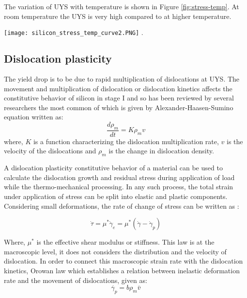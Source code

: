 The variation of UYS with temperature is shown in Figure \ref{fig:stress-temp}. At room temperature the UYS is very high compared to at higher temperature. 

\noindent
\begin{minipage}[c]{\textwidth}
\centering
       \texttt{[image: silicon\_stress\_temp\_curve2.PNG]}
      .
        \label{fig:stress-temp}
\end{minipage}

\subsection{Dislocation plasticity}

The yield drop is to be due to rapid multiplication of dislocations at UYS. The movement and multiplication of dislocation or dislocation kinetics affects the constitutive behavior of silicon in stage I and so has been reviewed by several researchers the most common of which is given by Alexander-Haasen-Sumino equation written as:
\begin{equation}
   \frac{d\rho_{m}}{dt} = K \rho_{m} v\label{has_1}
\end{equation}
where, $K$ is a function characterizing the dislocation multiplication rate, $v$ is the velocity of the dislocations and $\rho_{m}$ is the change in dislocation density.

A dislocation plasticity constitutive behavior of a material can be used to calculate the dislocation growth and residual stress during application of load while the thermo-mechanical processing. In any such process, the total strain under application of stress can be split into elastic and plastic components. Considering small deformations, the rate of change of stress can be written as :

\begin{equation}
   \dot{\tau} = \mu^{*}\dot{\gamma}_{e} = \mu^{*}(\dot{\gamma}- \dot{\gamma}_{p})\label{rate_eqn}
\end{equation}

Where, $\mu^{*}$ is the effective shear modulus or stiffness. This law is at the macroscopic level, it does not considers the distribution and the velocity of dislocation. In order to connect this macroscopic strain rate with the dislocation kinetics, Orowan law which establishes a relation between inelastic deformation rate and the movement of dislocations, given as:
\begin{equation}
   \dot{\gamma_{p}} = b \rho_{m} \bar{v} \label{orowan_law}
\end{equation}

